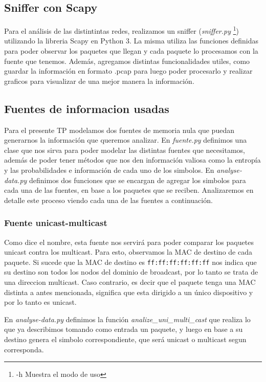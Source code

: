 \subsection{Sniffer con Scapy}

Para el an\'alisis de las distintintas redes, realizamos un sniffer (\emph{sniffer.py} \footnote{-h Muestra el modo de uso}) utilizando
la libreria Scapy en Python 3. La misma utiliza las funciones definidas para
poder observar los paquetes que llegan y cada paquete lo procesamos con la
fuente que tenemos. Adem\'as, agregamos distintas funcionalidades utiles, como
guardar la informaci\'on en formato .pcap para luego poder procesarlo y
realizar graficos para visualizar de una mejor manera la informaci\'on.

\subsection{Fuentes de informacion usadas}

Para el presente TP modelamos dos fuentes de memoria nula que puedan generarnos
la informaci\'on que queremos analizar. En \textit{fuente.py} definimos una
clase que nos sirva para poder modelar las distintas fuentes que necesitamos,
adem\'as de poder tener m\'etodos que nos den informaci\'on valiosa como la
entrop\'ia y las probabilidades e informaci\'on de cada uno de los simbolos. En
\textit{analyse-data.py} definimos dos funciones que se encargan de agregar los
simbolos para cada una de las fuentes, en base a los paquetes que se reciben.
Analizaremos en detalle este proceso viendo cada una de las fuentes a
continuaci\'on.

\subsubsection{Fuente unicast-multicast}

Como dice el nombre, esta fuente nos servir\'a para poder comparar los paquetes
unicast contra los multicast. Para esto, observamos la MAC de destino de cada
paquete. Si sucede que la MAC de destino es \texttt{ff:ff:ff:ff:ff:ff} nos
indica que su destino son todos los nodos del dominio de broadcast, por lo
tanto se trata de una direccion multicast. Caso contrario, es decir que el
paquete tenga una MAC distinta a antes mencionada, significa que esta dirigido
a un \'unico dispositivo y por lo tanto es unicast.

En \textit{analyse-data.py} definimos la funci\'on \textit{analize\_uni\_multi\_cast} que realiza lo que ya describimos tomando como entrada un paquete, y luego en base a su destino genera el simbolo correspondiente, que será unicast o multicast segun corresponda.


